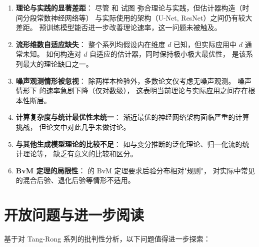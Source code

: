 \begin{enumerate}
    \item \textbf{理论与实践的显著差距}：
          尽管 \citep{tang2023lowdim} 和 \citep{tang2024diffusion} 试图
          弥合理论与实践，但估计器构造（时间分段常数神经网络等）
          与实际使用的架构（U-Net, ResNet）之间仍有较大差距。
          预训练模型能否进一步改善理论速率，这一问题未被触及。

    \item \textbf{流形维数自适应缺失}：
          整个系列均假设内在维度 $d$ 已知，但实际应用中 $d$ 通常未知。
          如何构造对 $d$ 自适应的估计器，同时保持极小极大最优性，
          是该系列最大的理论缺口之一。

    \item \textbf{噪声观测情形被忽视}：
          除两样本检验外，多数论文仅考虑无噪声观测。
          噪声情形下 \citep{tang2022minimax} 的速率急剧下降（仅对数级），
          这表明当前理论与实际应用之间存在根本性断层。

    \item \textbf{计算复杂度与统计最优性未统一}：
          渐近最优的神经网络架构面临严重的计算挑战，
          但论文中对此几乎未做讨论。

    \item \textbf{与其他生成模型理论的比较不足}：
          如与变分推断的泛化理论、归一化流的统计理论等，
          缺乏有意义的比较和区分。

    \item \textbf{BvM 定理的局限性}：
          \citep{tang2023robust} 的 BvM 定理要求后验分布相对"规则"，
          对实际中常见的混合后验、退化后验等情形不适用。
\end{enumerate}

\section{开放问题与进一步阅读}\label{sec:open}

基于对 Tang-Rong 系列的批判性分析，以下问题值得进一步探索：

